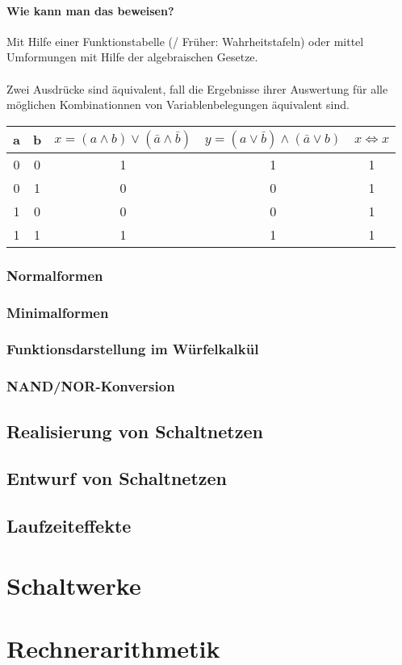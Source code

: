 \documentclass[a4paper]{scrartcl}
\begin{document}
					\paragraph{Wie kann man das beweisen?}
					Mit Hilfe einer Funktionstabelle (/ Früher: Wahrheitstafeln) oder mittel Umformungen mit Hilfe der algebraischen Gesetze.\\
					\\
					Zwei Ausdrücke sind äquivalent, fall die Ergebnisse ihrer Auswertung für alle möglichen Kombinationnen von Variablenbelegungen äquivalent sind. 
					\begin{table}[H]
						\centering
						\begin{tabular}{|c c|c|c|c|}
							\hline
							a&b&\( x = (a \wedge b) \vee (\bar{a} \wedge \bar{b}) \)& \(y = ( a \vee \bar{b} ) \wedge (\bar{a} \vee b ) \)& \( x \iff x\)\\ \hline 
							0&0&1&1&1\\
							0&1&0&0&1\\
							1&0&0&0&1\\
							1&1&1&1&1\\ \hline
						\end{tabular}
					\end{table}
			
			\subsubsection{Normalformen}
			\subsubsection{Minimalformen}
			\subsubsection{Funktionsdarstellung im Würfelkalkül}
			\subsubsection{NAND/NOR-Konversion}
			
		\subsection{Realisierung von Schaltnetzen}
		\subsection{Entwurf von Schaltnetzen}
		\subsection{Laufzeiteffekte}
	
	\section{Schaltwerke}
	\section{Rechnerarithmetik}
	
\end{document}
